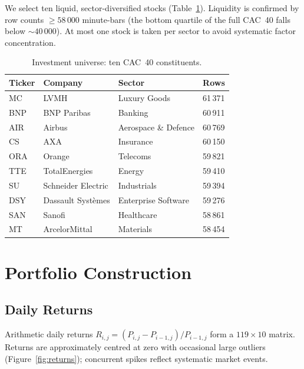 \documentclass[10pt, a4paper]{article}
\begin{document}
We select ten liquid, sector-diversified stocks (Table~\ref{tab:tickers}).
Liquidity is confirmed by row counts $\ge 58\,000$ minute-bars (the bottom quartile
of the full CAC~40 falls below $\sim 40\,000$). At most one stock is taken per sector
to avoid systematic factor concentration.

\begin{table}[H]
\centering
\caption{Investment universe: ten CAC~40 constituents.}
\label{tab:tickers}
\small\setlength{\tabcolsep}{5pt}
\begin{tabular}{llll}
\toprule
\textbf{Ticker} & \textbf{Company} & \textbf{Sector} & \textbf{Rows} \\
\midrule
MC  & LVMH                    & Luxury Goods            & 61\,371 \\
BNP & BNP Paribas              & Banking                 & 60\,911 \\
AIR & Airbus                   & Aerospace \& Defence    & 60\,769 \\
CS  & AXA                      & Insurance               & 60\,150 \\
ORA & Orange                   & Telecoms                & 59\,821 \\
TTE & TotalEnergies            & Energy                  & 59\,410 \\
SU  & Schneider Electric       & Industrials             & 59\,394 \\
DSY & Dassault Syst\`emes      & Enterprise Software     & 59\,276 \\
SAN & Sanofi                   & Healthcare              & 58\,861 \\
MT  & ArcelorMittal            & Materials               & 58\,454 \\
\bottomrule
\end{tabular}
\end{table}

\section{Portfolio Construction}

\subsection{Daily Returns}

Arithmetic daily returns $R_{i,j} = (P_{i,j} - P_{i-1,j})/P_{i-1,j}$ form a
$119\times10$ matrix. Returns are approximately centred at zero with occasional large
outliers (Figure~\ref{fig:returns}); concurrent spikes reflect systematic market events.
\end{document}
